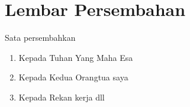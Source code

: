 \chapter*{Lembar Persembahan}

  Sata persembahkan
  \begin{enumerate}
      \item Kepada Tuhan Yang Maha Esa
      \item Kepada Kedua Orangtua saya
      \item Kepada Rekan kerja dll
  \end{enumerate}